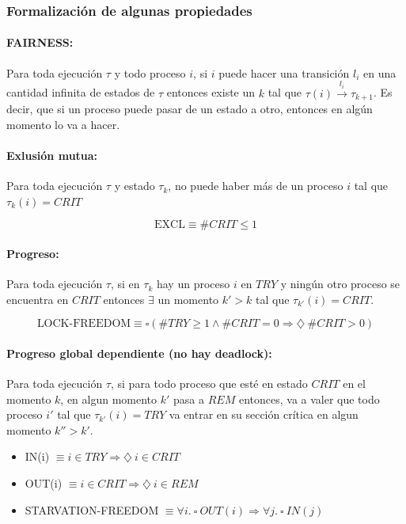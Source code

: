 \subsubsection{Formalización de algunas propiedades}

\paragraph{FAIRNESS:} Para toda ejecución $\tau$ y todo proceso $i$, si $i$ puede hacer una transición $l_i$ en una cantidad infinita de estados de $\tau$ entonces existe un $k$ tal que $\tau(i)\overset{l_i}{\rightarrow}\tau_{k+1}$. Es decir, que si un proceso puede pasar de un estado a otro, entonces en algún momento lo va a hacer.

\paragraph{Exlusión mutua:} Para toda ejecución $\tau$ y estado $\tau_k$, no puede haber más de un proceso $i$ tal que $\tau_k(i) = CRIT$

$$\text{EXCL} \equiv \#CRIT \leq 1$$

\paragraph{Progreso:} Para toda ejecución $\tau$, si en $\tau_k$ hay un proceso $i$ en $TRY$ y ningún otro proceso se encuentra en $CRIT$ entonces $\exists$ un momento $k' > k$ tal que $\tau_{k'}(i) = CRIT$.

$$\text{LOCK-FREEDOM} \equiv \square(\#TRY \geq 1 \land \#CRIT = 0 \Rightarrow \diamondsuit~\#CRIT > 0)$$

\paragraph{Progreso global dependiente (no hay deadlock):} Para toda ejecución $\tau$, si para todo proceso que esté en estado $CRIT$ en el momento $k$, en algun momento $k'$ pasa a $REM$ entonces, va a valer que todo proceso $i'$ tal que $\tau_{k'}(i) = TRY$ va entrar en su sección crítica en algun momento $k'' > k'$.

\begin{itemize}
\item IN(i) $\equiv i \in TRY \Rightarrow \diamondsuit ~i\in CRIT$
\item OUT(i) $\equiv i \in CRIT \Rightarrow \diamondsuit~ i\in REM$
\item STARVATION-FREEDOM $\equiv \forall i.~\square~ OUT(i) \Rightarrow \forall j.~\square ~IN(j)$	
\end{itemize}

